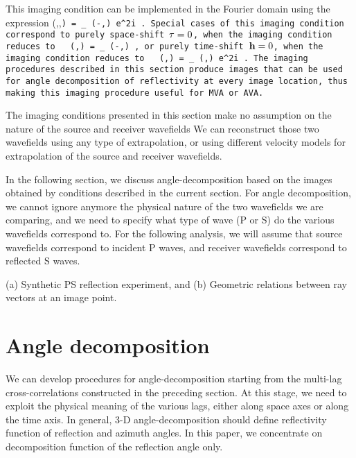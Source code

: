 This imaging condition can be implemented in the
Fourier domain using the expression
\beq \label{eqn:imgDw}
\RR   \left(\mm,\hh,\tt \right) = \sum_\w
   \US\left(\mm-\hh,\w  \right)
\K{\UR\left(\mm-\hh,\w  \right)} e^{2i\w\tt} \;.
\eeq
Special cases of this imaging condition correspond to
purely space-shift $\tt=0$, when the imaging condition reduces to
\cite[]{SavaFomel.segab2.2005}
\beq \label{eqn:imgHw}
\RR   \left(\mm,\hh      \right) = \sum_\w
   \US\left(\mm-\hh ,\w  \right)
\K{\UR\left(\mm+\hh ,\w  \right)} \;,
\eeq
or purely time-shift $\hh=0$, when the imaging condition reduces to
\cite[]{SavaFomel.geo.tsic}
\beq \label{eqn:imgTw}
\RR   \left(\mm,\tt \right) = \sum_\w
   \US\left(\mm,\w  \right)
\K{\UR\left(\mm,\w  \right)} e^{2i\w\tt} \;.
\eeq
The imaging procedures described in this section produce
images that can be used for angle decomposition
of reflectivity at every image location, thus making this 
imaging procedure useful for MVA or AVA.

The imaging conditions presented in this section make no assumption
on the nature of the source and receiver wavefields
We can reconstruct those two wavefields using any type of
extrapolation, or using different velocity models for extrapolation of
the source and receiver wavefields.

In the following section, we discuss angle-decomposition based on the
images obtained by conditions described in the current section.
For angle decomposition, we cannot ignore anymore the physical nature
of the two wavefields we are comparing, and we need to specify
what type of wave (P or S) do the various wavefields correspond to.
For the following analysis, we will assume that source wavefields
correspond to incident P waves, and receiver wavefields correspond to
reflected S waves.

{ (a) Synthetic PS reflection experiment, and
  (b) Geometric relations between ray vectors at an image point.}

\section{Angle decomposition}
We can develop procedures for angle-decomposition starting
from the multi-lag cross-correlations constructed in the preceding
section. At this stage, we need to exploit the physical
meaning of the various lags, either along space axes or along
the time axis. In general, 3-D angle-decomposition should define 
reflectivity function of reflection and azimuth angles.
In this paper, we concentrate on decomposition function 
of the reflection angle only.

